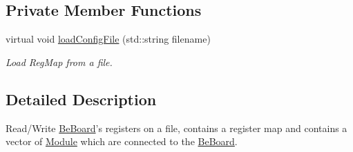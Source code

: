 \subsection*{Private Member Functions}
\begin{DoxyCompactItemize}
\item 
virtual void \hyperlink{class_ph2___hw_description_1_1_be_board_a1aaade58f564544b17de9509ad82cb0e}{load\-Config\-File} (std\-::string filename)
\begin{DoxyCompactList}\small\item\em Load Reg\-Map from a file. \end{DoxyCompactList}\end{DoxyCompactItemize}


\subsection{Detailed Description}
Read/\-Write \hyperlink{class_ph2___hw_description_1_1_be_board}{Be\-Board}'s registers on a file, contains a register map and contains a vector of \hyperlink{class_ph2___hw_description_1_1_module}{Module} which are connected to the \hyperlink{class_ph2___hw_description_1_1_be_board}{Be\-Board}. 

